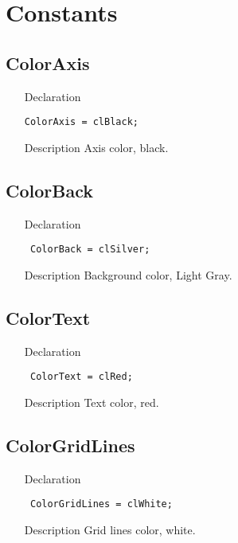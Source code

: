 \documentclass[12pt,a4paper,oneside]{report}
\newcommand{\declarationitem}[1]{{\addfontfeatures{FakeSlant} #1}}
\newcommand{\descriptiontitle}[1]{{\addfontfeatures{FakeSlant}#1}}
\newcommand{\code}[1]{\texttt{#1}}
\begin{document}
\section{Constants}
\subsection*{ColorAxis}
\label{lmcoordsys-ColorAxis}
\begin{itemize}\item[\declarationitem{Declaration}\hfill]
\begin{flushleft}
\code{ColorAxis      =  clBlack;}
\end{flushleft}
\item[\descriptiontitle{Description}]
Axis color, black.
\end{itemize}
\subsection*{ColorBack}
\label{lmcoordsys-ColorBack}
\begin{itemize}\item[\declarationitem{Declaration}\hfill]
\begin{flushleft}
\code{
ColorBack      =  clSilver;}
\end{flushleft}
\item[\descriptiontitle{Description}]
Background color, Light Gray.
\end{itemize}
\subsection*{ColorText}
\label{lmcoordsys-ColorText}
\begin{itemize}\item[\declarationitem{Declaration}\hfill]
\begin{flushleft}
\code{
ColorText      =  clRed;}
\end{flushleft}
\item[\descriptiontitle{Description}]
Text color, red.
\end{itemize}
\subsection*{ColorGridLines}
\label{lmcoordsys-ColorGridLines}
\begin{itemize}\item[\declarationitem{Declaration}\hfill]
\begin{flushleft}
\code{
ColorGridLines = clWhite;}
\end{flushleft}
\item[\descriptiontitle{Description}]
Grid lines color, white.
\end{itemize}
\end{document}
